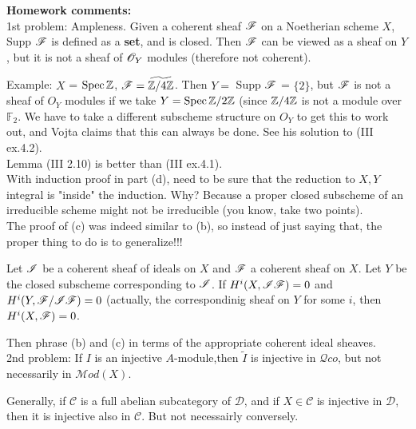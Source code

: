  \setcounter{lecture}{23}

\textbf{Homework comments:}\\

1st problem: Ampleness. Given a coherent sheaf $\mathscr{F}$ on a
Noetherian scheme $X$, Supp $\mathscr{F}$ is defined as a \textbf{set}, and
is closed. Then $\mathscr{F}$ can be viewed as a sheaf on $Y$, but it is
not a sheaf of $\mathscr{O}_Y$ modules (therefore not coherent).

Example: $X$ = $\text{\rm Spec\,}{\mathbb{Z}}$, $\mathscr{F} = \widetilde{\mathbb{Z}/4\mathbb{Z}}$. Then $Y = $
Supp $\mathscr{F}$ = $\{2\}$, but $\mathscr{F}$ is not a sheaf of $O_Y$ modules if
we take $Y = \text{\rm Spec\,}{\mathbb{Z}/2\mathbb{Z}}$ (since $\mathbb{Z}/4\mathbb{Z}$ is not a module over
$\mathbb{F}_2$. We have to take a different subscheme structure on
$O_Y$ to get this to work out, and Vojta claims that this can
always
be done. See his solution to (III ex.4.2).\\

Lemma (III 2.10) is better than (III ex.4.1).\\

With induction proof in part (d), need to be sure that the
reduction to $X,Y$ integral is "inside" the induction. Why?
Because a proper closed subscheme of an irreducible scheme might
not be irreducible
(you know, take two points).\\

The proof of (c) was indeed similar to (b), so instead of just
saying that, the proper thing to do is to generalize!!!

\begin{lemma} Let $\mathscr{I}$ be a coherent sheaf of ideals on $X$ and
$\mathscr{F}$ a coherent sheaf on $X$. Let $Y$ be the closed subscheme
corresponding to $\mathscr{I}$. If $H^i(X,\mathscr{I}\mathscr{F})=0$ and $H^i(Y,\mathscr{F}/\mathscr{I}\mathscr{F})=0$
(actually, the correspondinig sheaf on $Y$ for some $i$, then
$H^i(X,\mathscr{F})=0$. \end{lemma} Then phrase (b) and (c) in terms of the
appropriate
coherent ideal sheaves.\\

2nd problem: If $I$ is an injective $A$-module,then
$\widetilde{I}$ is injective in $\mathscr{Q}co$, but not
necessarily in $\mathscr{M}od(X)$.

Generally, if $\mathscr{C}$ is a full abelian subcategory of
$\mathscr{D}$, and if $X \in \mathscr{C}$ is injective in
$\mathscr{D}$, then it is injective also in $\mathscr{C}$. But not
necessairly conversely.\\



